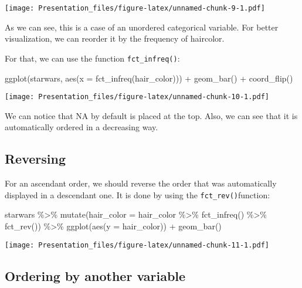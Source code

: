 \documentclass[
]{article}
\newenvironment{Shaded}{\begin{snugshade}}{\end{snugshade}}
\newcommand{\AttributeTok}[1]{\textcolor[rgb]{0.77,0.63,0.00}{#1}}
\newcommand{\FunctionTok}[1]{\textcolor[rgb]{0.00,0.00,0.00}{#1}}
\newcommand{\NormalTok}[1]{#1}
\newcommand{\SpecialCharTok}[1]{\textcolor[rgb]{0.00,0.00,0.00}{#1}}
\begin{document}
\texttt{[image: Presentation\_files/figure-latex/unnamed-chunk-9-1.pdf]}

As we can see, this is a case of an unordered categorical variable. For
better visualization, we can reorder it by the frequency of haircolor.

For that, we can use the function \texttt{fct\_infreq()}:

\begin{Shaded}
\begin{Highlighting}[]
\FunctionTok{ggplot}\NormalTok{(starwars, }\FunctionTok{aes}\NormalTok{(}\AttributeTok{x =} \FunctionTok{fct\_infreq}\NormalTok{(hair\_color))) }\SpecialCharTok{+} 
  \FunctionTok{geom\_bar}\NormalTok{() }\SpecialCharTok{+} 
  \FunctionTok{coord\_flip}\NormalTok{()}
\end{Highlighting}
\end{Shaded}

\texttt{[image: Presentation\_files/figure-latex/unnamed-chunk-10-1.pdf]}

We can notice that NA by default is placed at the top. Also, we can see
that it is automatically ordered in a decreasing way.

\hypertarget{reversing}{%
\subsection{Reversing}\label{reversing}}

For an ascendant order, we should reverse the order that was
automatically displayed in a descendant one. It is done by using the
\texttt{fct\_rev()}function:

\begin{Shaded}
\begin{Highlighting}[]
\NormalTok{starwars }\SpecialCharTok{\%\textgreater{}\%}
  \FunctionTok{mutate}\NormalTok{(}\AttributeTok{hair\_color =}\NormalTok{ hair\_color }\SpecialCharTok{\%\textgreater{}\%} \FunctionTok{fct\_infreq}\NormalTok{() }\SpecialCharTok{\%\textgreater{}\%} \FunctionTok{fct\_rev}\NormalTok{()) }\SpecialCharTok{\%\textgreater{}\%}
  \FunctionTok{ggplot}\NormalTok{(}\FunctionTok{aes}\NormalTok{(}\AttributeTok{y =}\NormalTok{ hair\_color)) }\SpecialCharTok{+}
    \FunctionTok{geom\_bar}\NormalTok{()}
\end{Highlighting}
\end{Shaded}

\texttt{[image: Presentation\_files/figure-latex/unnamed-chunk-11-1.pdf]}

\hypertarget{ordering-by-another-variable}{%
\subsection{Ordering by another
variable}\label{ordering-by-another-variable}}
\end{document}
